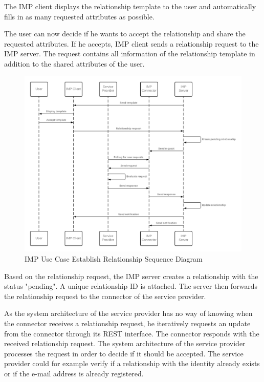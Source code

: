 The IMP client displays the relationship template to the user and automatically fills in as many requested attributes as possible.

The user can now decide if he wants to accept the relationship and share the requested attributes. If he accepts, IMP client sends a relationship request to the IMP server. The request contains all information of the relationship template in addition to the shared attributes of the user.

\begin{figure}[h]
    \centering
    \caption{IMP Use Case Establish Relationship Sequence Diagram}
    \includegraphics[scale=0.3]{Diagrams/IMP Use Case Establish Relationship Sequence Diagram 2.png}
\end{figure}

Based on the relationship request, the IMP server creates a relationship with the status "pending". A unique relationship ID is attached. The server then forwards the relationship request to the connector of the service provider.

As the system architecture of the service provider has no way of knowing when the connector receives a relationship request, he iteratively requests an update from the connector through its REST interface. The connector responds with the received relationship request. The system architecture of the service provider processes the request in order to decide if it should be accepted. The service provider could for example verify if a relationship with the identity already exists or if the e-mail address is already registered.

